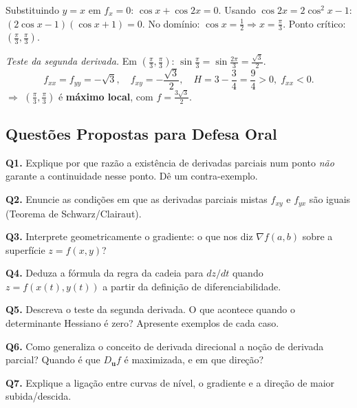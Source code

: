 \begin{solbox}
  Substituindo $y=x$ em $f_x=0$:
  $\cos x + \cos 2x = 0$.
  Usando $\cos 2x = 2\cos^2 x - 1$:
  $(2\cos x - 1)(\cos x + 1) = 0$.
  No domínio: $\cos x = \tfrac{1}{2} \Rightarrow x=\tfrac{\pi}{3}$.
  Ponto crítico: $\left(\tfrac{\pi}{3},\tfrac{\pi}{3}\right)$.

  \emph{Teste da segunda derivada.}
  Em $\left(\tfrac{\pi}{3},\tfrac{\pi}{3}\right)$: $\sin\tfrac{\pi}{3}=\sin\tfrac{2\pi}{3}=\tfrac{\sqrt{3}}{2}$.
  \[
    f_{xx}=f_{yy}=-\sqrt{3},\quad f_{xy}=-\frac{\sqrt{3}}{2},\quad
    H = 3-\frac{3}{4}=\frac{9}{4}>0,\; f_{xx}<0.
  \]
  $\Rightarrow$ $\left(\tfrac{\pi}{3},\tfrac{\pi}{3}\right)$ é \textbf{máximo local},
  com $f=\tfrac{3\sqrt{3}}{2}$.
\end{solbox}

\subsection{Questões Propostas para Defesa Oral}

\begin{oralbox}
  \textbf{Q1.} Explique por que razão a existência de derivadas parciais num ponto
  \emph{não} garante a continuidade nesse ponto. Dê um contra-exemplo.
\end{oralbox}

\begin{oralbox}
  \textbf{Q2.} Enuncie as condições em que as derivadas parciais mistas $f_{xy}$
  e $f_{yx}$ são iguais (Teorema de Schwarz/Clairaut).
\end{oralbox}

\begin{oralbox}
  \textbf{Q3.} Interprete geometricamente o gradiente: o que nos diz $\nabla f(a,b)$
  sobre a superfície $z=f(x,y)$?
\end{oralbox}

\begin{oralbox}
  \textbf{Q4.} Deduza a fórmula da regra da cadeia para $dz/dt$ quando
  $z=f(x(t),y(t))$ a partir da definição de diferenciabilidade.
\end{oralbox}

\begin{oralbox}
  \textbf{Q5.} Descreva o teste da segunda derivada. O que acontece quando o
  determinante Hessiano é zero? Apresente exemplos de cada caso.
\end{oralbox}

\begin{oralbox}
  \textbf{Q6.} Como generaliza o conceito de derivada direcional a noção de
  derivada parcial? Quando é que $D_{\mathbf{u}}f$ é maximizada, e em
  que direção?
\end{oralbox}

\begin{oralbox}
  \textbf{Q7.} Explique a ligação entre curvas de nível, o gradiente e a direção
  de maior subida/descida.
\end{oralbox}